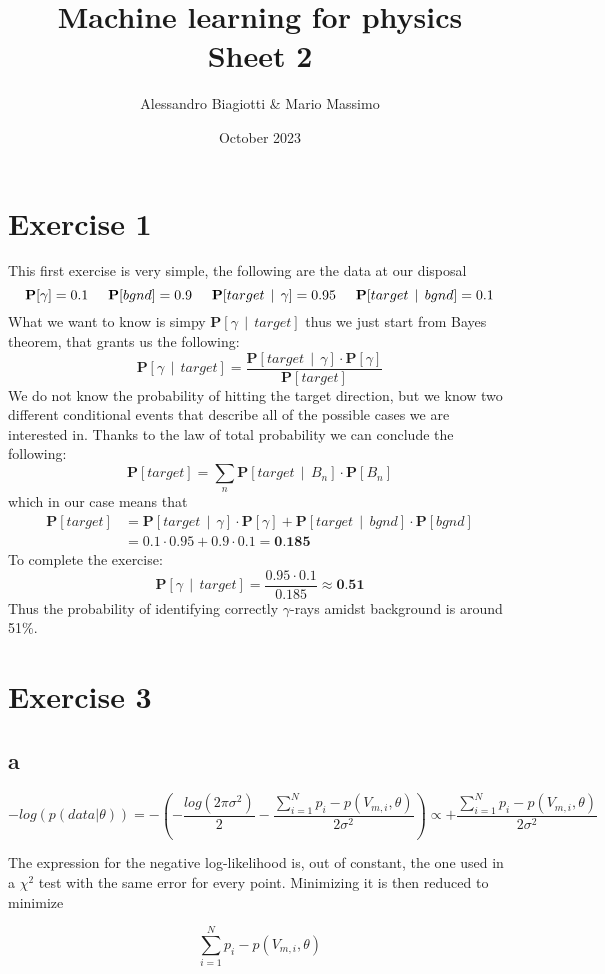\documentclass{article}
\title{Machine learning for physics \\ \large Sheet 2}
\author{Alessandro Biagiotti \& Mario Massimo}
\date{October 2023}
\newcommand{\spc}{\:\:}
\newcommand{\prob}[1]{\textbf{P}[#1]}
\newcommand{\cprob}[2]{\prob{#1 \spc | \spc #2}}
\begin{document}
\maketitle
\section{Exercise 1}
This first exercise is very simple, the following are the data at our disposal
\begin{equation*}
    \prob{\gamma} = 0.1 \hspace{0.5cm} 
    \prob{bgnd} = 0.9 \hspace{0.5cm}
    \cprob{target}{\gamma} = 0.95 \hspace{0.5cm}
    \cprob{target}{bgnd} = 0.1
\end{equation*}
What we want to know is simpy $\cprob{\gamma}{target}$ thus we just start from Bayes theorem, that grants us the following:
\begin{equation}
    \cprob{\gamma}{target} = \frac{\cprob{target}{\gamma} \cdot \prob{\gamma}}{\prob{target}}
\end{equation}
We do not know the probability of hitting the target direction, but we know two different conditional events that describe all of the possible cases we are interested in. Thanks to the law of total probability we can conclude the following:
\begin{equation}
    \prob{target} = \sum_n{\cprob{target}{B_n} \cdot \prob{B_n}}
\end{equation}
which in our case means that
\begin{align*}
    \prob{target} &= \cprob{target}{\gamma} \cdot \prob{\gamma} + \cprob{target}{bgnd} \cdot \prob{bgnd} \\
    &= 0.1 \cdot 0.95 + 0.9 \cdot 0.1 = \textbf{0.185}
\end{align*}
To complete the exercise:
\begin{equation*}
    \cprob{\gamma}{target} = \frac{0.95 \cdot 0.1}{0.185} \approx \textbf{0.51}
\end{equation*}
Thus the probability of identifying correctly $\gamma$-rays amidst background is around 51\%.
\pagebreak
\section{Exercise 3}
\subsection{a}
\begin{equation*}
    - log(p(data|\theta))= - \left(-\frac{log(2\pi \sigma^2)}{2} - \frac{\sum_{i=1}^N p_i - p(V_{m,i},\theta)}{2 \sigma^2}\right) \propto 
   + \frac{\sum_{i=1}^N p_i - p(V_{m,i},\theta)}{2 \sigma^2}
\end{equation*}

The expression for the negative log-likelihood is, out of constant, the one used in a $\chi^2$ test with the same error for every point. Minimizing it is then reduced to minimize

\begin{equation*}
    \sum_{i=1}^N p_i - p(V_{m,i},\theta)
\end{equation*}
    
\end{document}
